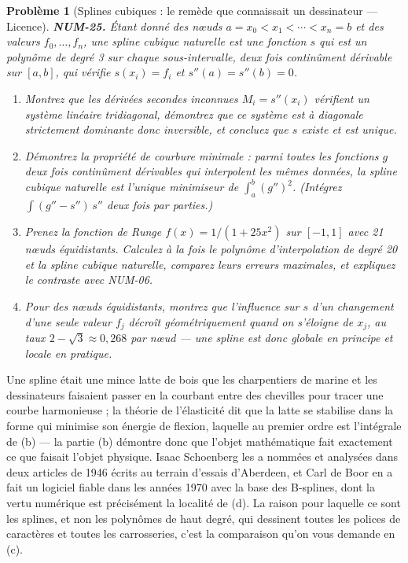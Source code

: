 \documentclass[11pt]{article}
\newtheorem{problem}{Problème}
\begin{document}
\bigskip

\begin{problem}[{Splines cubiques : le remède que connaissait un dessinateur --- Licence}]
\textbf{NUM-25.} Étant donné des n\oe{}uds $a = x_0 < x_1 < \cdots < x_n = b$ et des valeurs $f_0, \dots, f_n$, une \textit{spline cubique naturelle} est une fonction $s$ qui est un polynôme de degré 3 sur chaque sous-intervalle, deux fois continûment dérivable sur $[a,b]$, qui vérifie $s(x_i) = f_i$ et $s''(a) = s''(b) = 0$.
\begin{enumerate}
\item[(a)] Montrez que les dérivées secondes inconnues $M_i = s''(x_i)$ vérifient un système linéaire tridiagonal, démontrez que ce système est à diagonale strictement dominante donc inversible, et concluez que $s$ existe et est unique.
\item[(b)] Démontrez la propriété de courbure minimale : parmi \textit{toutes} les fonctions $g$ deux fois continûment dérivables qui interpolent les mêmes données, la spline cubique naturelle est l'unique minimiseur de $\int_a^b (g'')^2$. (Intégrez $\int (g'' - s'')\,s''$ deux fois par parties.)
\item[(c)] Prenez la fonction de Runge $f(x) = 1/(1+25x^2)$ sur $[-1,1]$ avec 21 n\oe{}uds équidistants. Calculez à la fois le polynôme d'interpolation de degré 20 et la spline cubique naturelle, comparez leurs erreurs maximales, et expliquez le contraste avec NUM-06.
\item[(d)] Pour des n\oe{}uds équidistants, montrez que l'influence sur $s$ d'un changement d'une seule valeur $f_j$ décroît géométriquement quand on s'éloigne de $x_j$, au taux $2 - \sqrt{3} \approx 0{,}268$ par n\oe{}ud --- une spline est donc globale en principe et locale en pratique.
\end{enumerate}

\end{problem}

\noindent Une spline était une mince latte de bois que les charpentiers de marine et les dessinateurs faisaient passer en la courbant entre des chevilles pour tracer une courbe harmonieuse ; la théorie de l'élasticité dit que la latte se stabilise dans la forme qui minimise son énergie de flexion, laquelle au premier ordre est l'intégrale de (b) --- la partie (b) démontre donc que l'objet mathématique fait exactement ce que faisait l'objet physique. Isaac Schoenberg les a nommées et analysées dans deux articles de 1946 écrits au terrain d'essais d'Aberdeen, et Carl de Boor en a fait un logiciel fiable dans les années 1970 avec la base des B-splines, dont la vertu numérique est précisément la localité de (d). La raison pour laquelle ce sont les splines, et non les polynômes de haut degré, qui dessinent toutes les polices de caractères et toutes les carrosseries, c'est la comparaison qu'on vous demande en (c).
\end{document}
